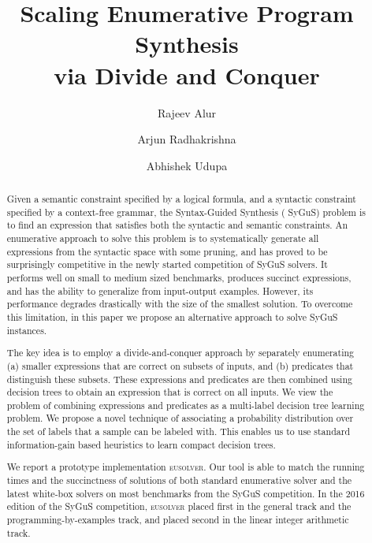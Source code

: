 \documentclass{llncs}
\newcommand\arsays[1]{{\color{red} \bf AR: #1}}
\newcommand{\sygus}{{\sffamily\fontsize{8.5}{10}\selectfont
    SyGuS}\xspace}
\newcommand{\eusolver}{\textsc{eusolver}\xspace}
\begin{document}


\pagestyle{plain}
\title{
  \texorpdfstring{Scaling Enumerative Program Synthesis\\via
    Divide and Conquer}{Scaling Enumerative Program Synthesis via Divide and Conquer}
  \vspace{-2ex}
  }
\author{
  \vspace{-1ex}
  Rajeev Alur \and Arjun Radhakrishna \and Abhishek Udupa}
\maketitle
\vspace*{-6ex}

\begin{abstract}
  Given a semantic constraint specified by a logical formula, and
  a syntactic constraint specified by a context-free grammar, the
  Syntax-Guided Synthesis (\sygus) problem is to find an expression
  that satisfies both the syntactic and semantic constraints.
  An enumerative approach to solve this problem is to systematically
  generate all expressions from the syntactic space with some pruning,
  and has proved to be surprisingly competitive in the newly started
  competition of \sygus solvers.  It performs well on small to medium sized
  benchmarks, produces succinct expressions, and has the ability to
  generalize from input-output examples.  However, its performance
  degrades drastically with the size of the smallest solution. To overcome
  this limitation, in this paper we propose an alternative approach to
  solve \sygus instances.

  The key idea  is to employ a divide-and-conquer approach by
  separately enumerating (a) smaller expressions that are correct on
  subsets of inputs, and (b) predicates that distinguish these
  subsets.  These expressions and predicates are then combined
  using decision trees to obtain an expression that is correct on all
  inputs.  We view the problem of combining expressions and predicates as
  a multi-label decision tree learning problem. We propose a novel
  technique of associating a probability distribution over the set of
  labels that a sample can be labeled with. This enables us to use
  standard information-gain based heuristics to learn compact decision
  trees.

  We report a prototype implementation \eusolver. Our tool is able to
  match the running times and the succinctness of solutions of both
  standard enumerative solver and the latest white-box solvers on
  most benchmarks from the \sygus competition. In the 2016 edition of
  the \sygus competition, \eusolver placed first in the general track
  and the programming-by-examples track, and placed second in the linear
  integer arithmetic track.
\end{abstract}
\end{document}
